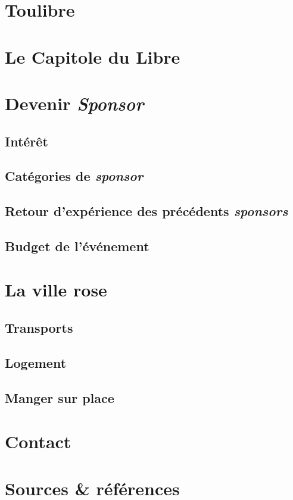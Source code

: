\documentclass{cdl_sponsor}
\begin{document}
\section{Toulibre}

\section{Le Capitole du Libre}

\section{Devenir \textit{Sponsor}}

	\subsection{Intérêt}
	\subsection{Catégories de \textit{sponsor}}
	\subsection{Retour d’expérience des précédents \textit{sponsors}}
	\subsection{Budget de l’événement}

\section{La ville rose}

	\subsection{Transports}
	\subsection{Logement}
	\subsection{Manger sur place}
	
\section{Contact}

\section{Sources \& références}
\end{document}
